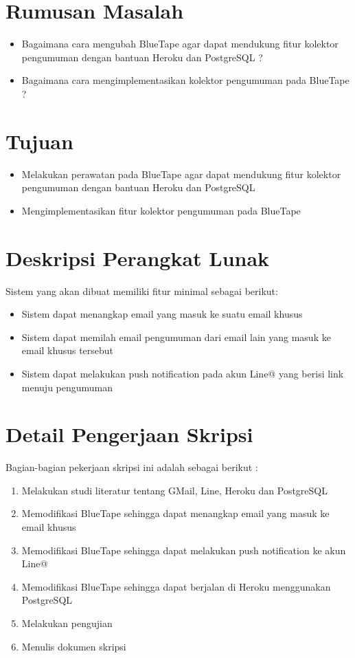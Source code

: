 \documentclass[a4paper,twoside]{article}
\begin{document}
\section{Rumusan Masalah}
\begin{itemize}
\item Bagaimana cara mengubah BlueTape agar dapat mendukung fitur kolektor pengumuman dengan bantuan Heroku dan PostgreSQL ?
\item Bagaimana cara mengimplementasikan kolektor pengumuman pada BlueTape ?
\end{itemize}

\section{Tujuan}
\begin{itemize}
\item Melakukan perawatan pada BlueTape agar dapat mendukung fitur kolektor pengumuman dengan bantuan Heroku dan PostgreSQL
\item Mengimplementasikan fitur kolektor pengumuman pada BlueTape
\end{itemize}

\section{Deskripsi Perangkat Lunak}
Sistem yang akan dibuat memiliki fitur minimal sebagai berikut:
\begin{itemize}
\item Sistem dapat menangkap email yang masuk ke suatu email khusus
\item Sistem dapat memilah email pengumuman dari email lain yang masuk ke email khusus tersebut
\item Sistem dapat melakukan push notification pada akun Line@ yang berisi link menuju pengumuman 
\end{itemize}

\section{Detail Pengerjaan Skripsi}
Bagian-bagian pekerjaan skripsi ini adalah sebagai berikut :
	\begin{enumerate}
		\item Melakukan studi literatur tentang GMail, Line, Heroku dan PostgreSQL
		\item Memodifikasi BlueTape sehingga dapat menangkap email yang masuk ke email khusus
		\item Memodifikasi BlueTape sehingga dapat melakukan push notification ke akun Line@
		\item Memodifikasi BlueTape sehingga dapat berjalan di Heroku menggunakan PostgreSQL
		\item Melakukan pengujian
		\item Menulis dokumen skripsi
	\end{enumerate}
\end{document}

